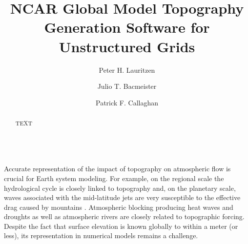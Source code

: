 \documentclass[gmd]{copernicus}
\begin{document}
\linenumbers

\title{NCAR Global Model Topography Generation Software for Unstructured Grids}

\author[1]{Peter H. Lauritzen}
\author[1]{Julio T. Bacmeister}
\author[1]{Patrick F. Callaghan}













\maketitle  %



\begin{abstract}
TEXT
\end{abstract}



\introduction  %
{\color{red}{define acronym CAM in introduction}}\\
Accurate representation of the impact of topography on atmospheric flow is crucial for Earth system modeling.  For example, on the regional scale the hydrological cycle is closely linked to topography and, on the planetary scale, waves associated with the mid-latitude jets are very susceptible to the effective drag caused by mountains \citep[e.g., ][]{LM1997QJRMS}. Atmospheric blocking producing heat waves and droughts as well as atmospheric rivers are closely related to topographic forcing. Despite the fact that surface elevation is known globally to within a meter (or less), its representation in numerical models remains a challenge.
\end{document}
